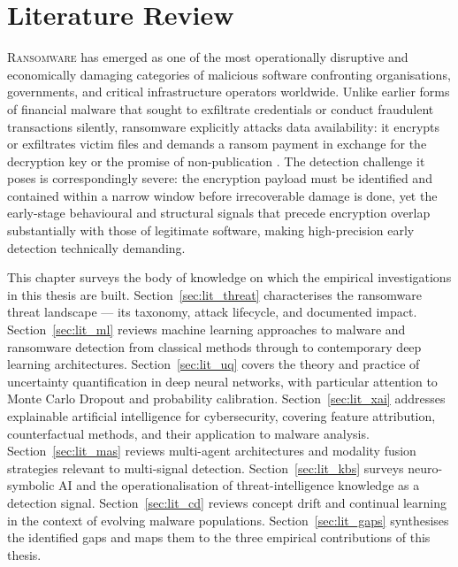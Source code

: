 
\chapter{Literature Review}
\label{chap:litreview}

\lettrine{R}{ansomware} has emerged as one of the most operationally disruptive and economically
damaging categories of malicious software confronting organisations, governments, and critical
infrastructure operators worldwide.
Unlike earlier forms of financial malware that sought to exfiltrate credentials or conduct
fraudulent transactions silently, ransomware explicitly attacks data availability: it encrypts
or exfiltrates victim files and demands a ransom payment in exchange for the decryption key or
the promise of non-publication \cite{beaman2021ransomware, greenberg2018untold}.
The detection challenge it poses is correspondingly severe: the encryption payload must be
identified and contained within a narrow window before irrecoverable damage is done, yet the
early-stage behavioural and structural signals that precede encryption overlap substantially
with those of legitimate software, making high-precision early detection technically demanding.

This chapter surveys the body of knowledge on which the empirical investigations in this
thesis are built.
Section~\ref{sec:lit_threat} characterises the ransomware threat landscape — its taxonomy,
attack lifecycle, and documented impact.
Section~\ref{sec:lit_ml} reviews machine learning approaches to malware and ransomware
detection from classical methods through to contemporary deep learning architectures.
Section~\ref{sec:lit_uq} covers the theory and practice of uncertainty quantification in
deep neural networks, with particular attention to Monte Carlo Dropout and probability
calibration.
Section~\ref{sec:lit_xai} addresses explainable artificial intelligence for cybersecurity,
covering feature attribution, counterfactual methods, and their application to malware
analysis.
Section~\ref{sec:lit_mas} reviews multi-agent architectures and modality fusion strategies
relevant to multi-signal detection.
Section~\ref{sec:lit_kbs} surveys neuro-symbolic AI and the operationalisation of
threat-intelligence knowledge as a detection signal.
Section~\ref{sec:lit_cd} reviews concept drift and continual learning in the context of
evolving malware populations.
Section~\ref{sec:lit_gaps} synthesises the identified gaps and maps them to the three
empirical contributions of this thesis.

